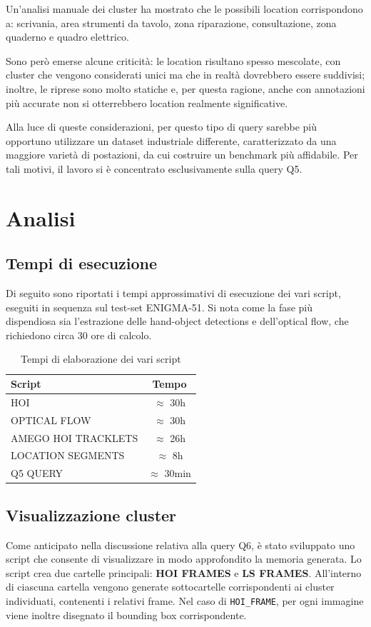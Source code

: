Un'analisi manuale dei cluster ha mostrato che le possibili location corrispondono a: scrivania, area strumenti da tavolo, zona riparazione, consultazione, zona quaderno e quadro elettrico.  

Sono però emerse alcune criticità: le location risultano spesso mescolate, con cluster che vengono considerati unici ma che in realtà dovrebbero essere suddivisi; inoltre, le riprese sono molto statiche e, per questa ragione, anche con annotazioni più accurate non si otterrebbero location realmente significative.  

Alla luce di queste considerazioni, per questo tipo di query sarebbe più opportuno utilizzare un dataset industriale differente, caratterizzato da una maggiore varietà di postazioni, da cui costruire un benchmark più affidabile. Per tali motivi, il lavoro si è concentrato esclusivamente sulla query Q5.

\section{Analisi}

\subsection*{Tempi di esecuzione}

Di seguito sono riportati i tempi approssimativi di esecuzione dei vari script, eseguiti in sequenza sul test-set ENIGMA-51.
Si nota come la fase più dispendiosa sia l'estrazione delle hand-object detections e dell'optical flow, che richiedono circa 30 ore di calcolo.

\begin{table}[ht]
    \centering
    \caption{Tempi di elaborazione dei vari script}
    \begin{tabular}{|l|c|}
        \hline
        \textbf{Script} & \textbf{Tempo} \\
        \hline
        HOI & $\approx$ 30h \\
        OPTICAL FLOW & $\approx$ 30h \\
        AMEGO HOI TRACKLETS & $\approx$ 26h \\
        LOCATION SEGMENTS & $\approx$ 8h \\
        Q5 QUERY & $\approx$ 30min \\
        \hline
    \end{tabular}
    \label{tab:tempi}
\end{table}

\subsection*{Visualizzazione cluster}
Come anticipato nella discussione relativa alla query Q6, è stato sviluppato uno script che consente di visualizzare in modo approfondito la memoria generata. Lo script crea due cartelle principali: \textbf{HOI FRAMES} e \textbf{LS FRAMES}.
All'interno di ciascuna cartella vengono generate sottocartelle corrispondenti ai cluster individuati, contenenti i relativi frame.
Nel caso di \texttt{HOI\_FRAME}, per ogni immagine viene inoltre disegnato il bounding box corrispondente.

